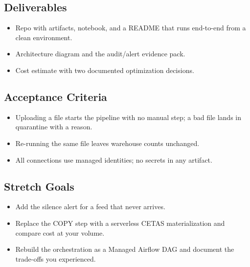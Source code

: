 \subsection*{Deliverables}
\begin{itemize}
    \item Repo with artifacts, notebook, and a README that runs end-to-end from a clean environment.
    \item Architecture diagram and the audit/alert evidence pack.
    \item Cost estimate with two documented optimization decisions.
\end{itemize}

\subsection*{Acceptance Criteria}
\begin{itemize}
    \item Uploading a file starts the pipeline with no manual step; a bad file lands in quarantine with a reason.
    \item Re-running the same file leaves warehouse counts unchanged.
    \item All connections use managed identities; no secrets in any artifact.
\end{itemize}

\subsection*{Stretch Goals}
\begin{itemize}
    \item Add the silence alert for a feed that never arrives.
    \item Replace the COPY step with a serverless CETAS materialization and compare cost at your volume.
    \item Rebuild the orchestration as a Managed Airflow DAG and document the trade-offs you experienced.
\end{itemize}
